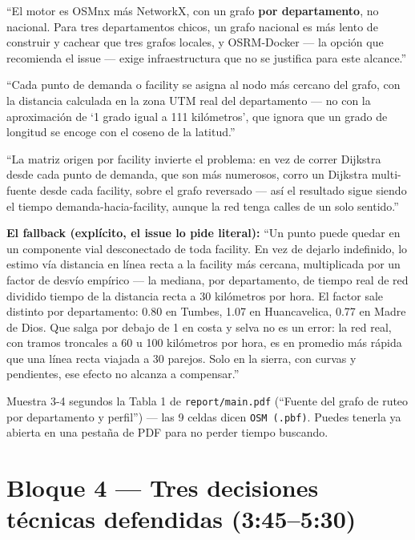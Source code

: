 \documentclass[11pt]{article}
\begin{document}
\begin{decirbox}
``El motor es OSMnx más NetworkX, con un grafo \textbf{por departamento},
no nacional. Para tres departamentos chicos, un grafo nacional es más
lento de construir y cachear que tres grafos locales, y OSRM-Docker ---
la opción que recomienda el issue --- exige infraestructura que no se
justifica para este alcance.''

``Cada punto de demanda o facility se asigna al nodo más cercano del
grafo, con la distancia calculada en la zona UTM real del departamento
--- no con la aproximación de `1 grado igual a 111 kilómetros', que
ignora que un grado de longitud se encoge con el coseno de la latitud.''

``La matriz origen por facility invierte el problema: en vez de correr
Dijkstra desde cada punto de demanda, que son más numerosos, corro un
Dijkstra multi-fuente desde cada facility, sobre el grafo reversado ---
así el resultado sigue siendo el tiempo demanda-hacia-facility, aunque la
red tenga calles de un solo sentido.''

\textbf{El fallback (explícito, el issue lo pide literal):} ``Un punto
puede quedar en un componente vial desconectado de toda facility. En vez
de dejarlo indefinido, lo estimo vía distancia en línea recta a la
facility más cercana, multiplicada por un factor de desvío empírico ---
la mediana, por departamento, de tiempo real de red dividido tiempo de la
distancia recta a 30 kilómetros por hora. El factor sale distinto por
departamento: 0.80 en Tumbes, 1.07 en Huancavelica, 0.77 en Madre de
Dios. Que salga por debajo de 1 en costa y selva no es un error: la red
real, con tramos troncales a 60 u 100 kilómetros por hora, es en
promedio más rápida que una línea recta viajada a 30 parejos. Solo en la
sierra, con curvas y pendientes, ese efecto no alcanza a compensar.''
\end{decirbox}

\begin{hacerbox}
Muestra 3-4 segundos la Tabla 1 de \texttt{report/main.pdf} (``Fuente del
grafo de ruteo por departamento y perfil'') --- las 9 celdas dicen
\texttt{OSM (.pbf)}. Puedes tenerla ya abierta en una pestaña de PDF para
no perder tiempo buscando.
\end{hacerbox}

\section{Bloque 4 --- Tres decisiones técnicas defendidas (3:45--5:30)}
\end{document}
